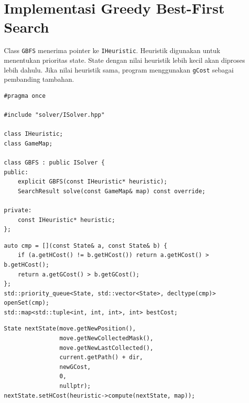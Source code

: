 \section{Implementasi Greedy Best-First Search}

Class \texttt{GBFS} menerima pointer ke \texttt{IHeuristic}. 
Heuristik digunakan untuk menentukan prioritas state. 
State dengan nilai heuristik lebih kecil akan diproses lebih dahulu. 
Jika nilai heuristik sama, program menggunakan \texttt{gCost} sebagai pembanding tambahan.

\begin{tcolorbox}[
	colback=orange!5,
	colframe=orange!70!black,
	title=\textbf{Potongan Source Code Asli: Deklarasi \texttt{GBFS.hpp}},
	arc=2mm,
	boxrule=0.8pt
]
\small
\begin{verbatim}
#pragma once

#include "solver/ISolver.hpp"

class IHeuristic;
class GameMap;

class GBFS : public ISolver {
public:
    explicit GBFS(const IHeuristic* heuristic);
    SearchResult solve(const GameMap& map) const override;

private:
    const IHeuristic* heuristic;
};
\end{verbatim}
\end{tcolorbox}

\begin{tcolorbox}[
	colback=orange!5,
	colframe=orange!70!black,
	title=\textbf{Potongan Source Code Asli: Prioritas GBFS},
	arc=2mm,
	boxrule=0.8pt
]
\small
\begin{verbatim}
auto cmp = [](const State& a, const State& b) {
    if (a.getHCost() != b.getHCost()) return a.getHCost() > b.getHCost();
    return a.getGCost() > b.getGCost();
};
std::priority_queue<State, std::vector<State>, decltype(cmp)> openSet(cmp);
std::map<std::tuple<int, int, int>, int> bestCost;
\end{verbatim}
\end{tcolorbox}

\begin{tcolorbox}[
	colback=orange!5,
	colframe=orange!70!black,
	title=\textbf{Potongan Source Code Asli: Perhitungan Heuristik pada GBFS},
	arc=2mm,
	boxrule=0.8pt
]
\small
\begin{verbatim}
State nextState(move.getNewPosition(),
                move.getNewCollectedMask(),
                move.getNewLastCollected(),
                current.getPath() + dir,
                newGCost,
                0,
                nullptr);
nextState.setHCost(heuristic->compute(nextState, map));
\end{verbatim}
\end{tcolorbox}

